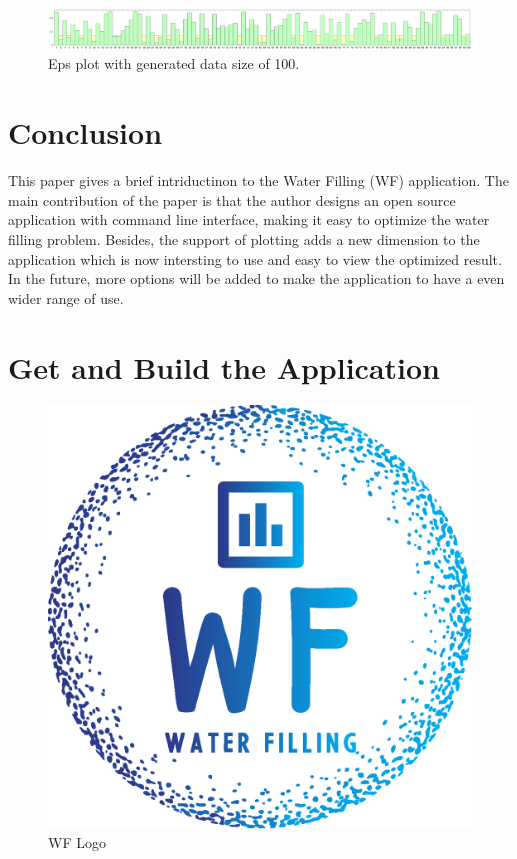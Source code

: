 \documentclass[journal,twoside]{IEEEtran}
\begin{document}
    \begin{figure}
      \centering
      \includegraphics[width=\linewidth]{fig/plot_100.eps}
      \caption{Eps plot with generated data size of 100.}
      \label{fig:plot_100_eps}
    \end{figure}

  \section{Conclusion}\label{sec:conclusion}

    This paper gives a brief intriductinon to the Water Filling (WF) application.
    The main contribution of the paper is that the author designs an open source application with command line interface,
    making it easy to optimize the water filling problem.
    Besides, the support of plotting adds a new dimension to the application which is now intersting to use and easy to view the optimized result.
    In the future, more options will be added to make the application to have a even wider range of use.

\appendices
  \section{Get and Build the Application}\label{sec:get}

    \begin{figure}
    \includegraphics[width=\linewidth]{fig/logo.eps} 
    \caption{WF Logo}
    \label{fig:logo}
    \end{figure}
\end{document}
